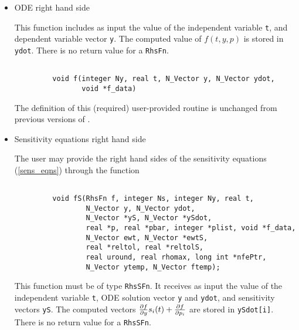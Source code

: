 \begin{itemize}

\item ODE right hand side

This function includes as input the value of the independent variable
{\tt t}, and dependent variable vector {\tt y}.
The computed value of $f(t, y, p)$ is stored in {\tt ydot}.
There is no return value for a {\tt RhsFn}.
\begin{verbatim}

         void f(integer Ny, real t, N_Vector y, N_Vector ydot, 
                void *f_data)

\end{verbatim}

The definition of this (required) user-provided routine is unchanged from
previous versions of {\code}.

\item Sensitivity equations right hand side

The user may provide the right hand sides of the sensitivity equations
(\ref{sens_eqns}) through the function 
\begin{verbatim}

         void fS(RhsFn f, integer Ns, integer Ny, real t, 
                 N_Vector y, N_Vector ydot, 
                 N_Vector *yS, N_Vector *ySdot, 
                 real *p, real *pbar, integer *plist, void *f_data,
                 N_Vector ewt, N_Vector *ewtS, 
                 real *reltol, real *reltolS,
                 real uround, real rhomax, long int *nfePtr,
                 N_Vector ytemp, N_Vector ftemp);

\end{verbatim}
This function must be of type {\tt RhsSFn}. It receives as input the
value of the independent variable {\tt t}, ODE solution vector {\tt y} and
{\tt ydot}, and sensitivity vectors {\tt yS}. The computed vectors
$\frac{\partial f}{\partial y} s_i(t) + \frac{\partial f}{\partial p_i}$ are stored in {\tt ySdot[i]}. 
There is no return value for a {\tt RhsSFn}.


\end{itemize}
